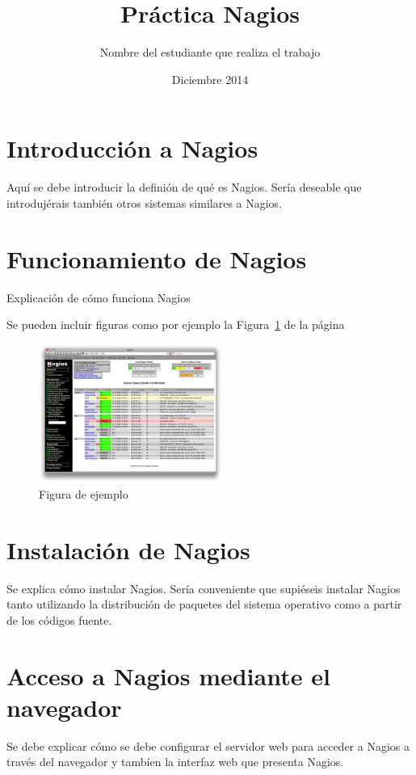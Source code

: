 \documentclass[11pt,a4paper]{article}
\title{Práctica Nagios}
\author{Nombre del estudiante que realiza el trabajo}
\date{Diciembre 2014}
\begin{document}
\maketitle
\tableofcontents
\clearpage

\section{Introducción a Nagios}

Aquí se debe introducir la definión de qué es Nagios\cite{web}. Sería deseable que introdujérais también 
otros sistemas similares a Nagios.

\section{Funcionamiento de Nagios}

Explicación de cómo funciona Nagios

Se pueden incluir figuras como por ejemplo la Figura~\ref{figura1} de la página \pageref{figura1}

\begin{figure}
\centerline{\includegraphics[width=6cm]{nagios3-1.png}}
\caption{Figura de ejemplo}
\label{figura1}
\end{figure}

\section{Instalación de Nagios}

Se explica cómo instalar Nagios. Sería conveniente que supiéseis instalar Nagios tanto utilizando
la distribución de paquetes del sistema operativo como a partir de los códigos fuente.

\section{Acceso a Nagios mediante el navegador}

Se debe explicar cómo se debe configurar el servidor web para acceder a Nagios a través del navegador
y  tambíen la interfaz web que presenta Nagios.
\end{document}
